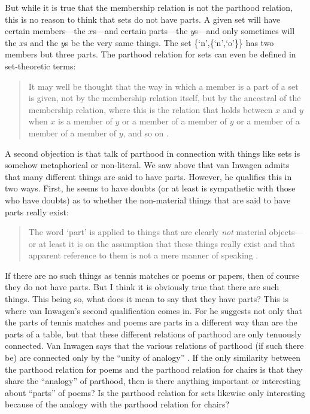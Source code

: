 \documentclass[12pt,twoside]{reedfancy}
\begin{document}
\begin{spacing}{1.25}
But while it is true that the membership relation is not the parthood
relation, this is no reason to think that sets do not have parts.  A
given set will have certain members---the $x$s---and certain
parts---the $y$s---and only sometimes will the $x$s and the $y$s be
the very same things.  The set \{`n',\{`n',`o'\}\} has two members
but three parts.  The parthood relation for sets can even be defined
in set-theoretic terms:

\begin{quote}
It may well be thought that the way in which a member is a part of a
set is given, not by the membership relation itself, but by the
ancestral of the membership relation, where this is the relation that
holds between $x$ and $y$ when $x$ is a member of $y$ or a member of a
member of $y$ or a member of a member of a member of $y$, and so on
\citep[563]{fine2010}.
\end{quote}

A second objection is that talk of parthood in connection with things
like sets is somehow metaphorical or non-literal.  We saw above that
van Inwagen admits that many different things are said to have parts.
However, he qualifies this in two ways.  First, he seems to have
doubts (or at least is sympathetic with those who have doubts) as to
whether the non-material things that are said to have parts really
exist:

\begin{quote}
The word `part' is applied to things that are clearly \emph{not}
material objects---or at least it is on the assumption that these
things really exist and that apparent reference to them is not a mere
manner of speaking \citep[19]{inwagen1995}.
\end{quote}

If there are no such things as tennis matches or poems or papers, then
of course they do not have parts.  But I think it is obviously true
that there are such things.  This being so, what does it mean to say
that they have parts?  This is where van Inwagen's second
qualification comes in.  For he suggests not only that the parts of
tennis matches and poems are parts in a different way than are the
parts of a table, but that these different relations of parthood are
only tenuously connected.  Van Inwagen says that the various relations
of parthood (if such there be) are connected only by the ``unity of
analogy'' \citeyearpar[19]{inwagen1995}.  If the only similarity
between the parthood relation for poems and the parthood relation for
chairs is that they share the ``analogy'' of parthood, then is there
anything important or interesting about ``parts'' of poems?  Is the
parthood relation for sets likewise only interesting because of the
analogy with the parthood relation for chairs?


\end{spacing}
\end{document}

